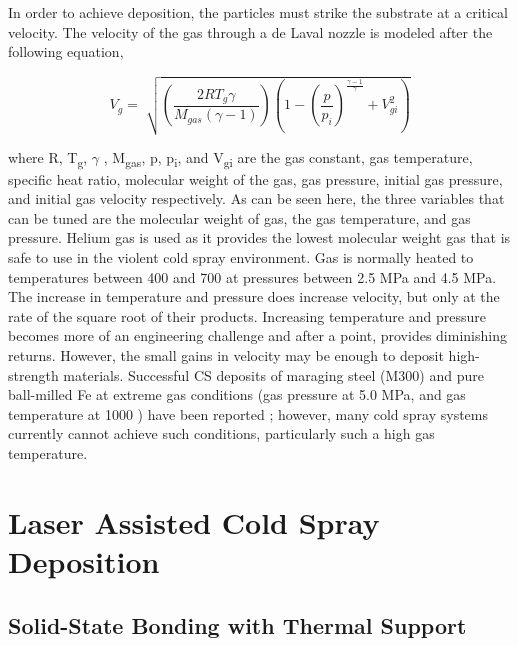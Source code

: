 		
		
		In order to achieve deposition, the particles must strike the substrate at a critical velocity. The velocity of the gas through a de Laval nozzle is modeled after the following equation,
		
		
		\begin{equation}
			V_{g}=\sqrt[]{ \left( \frac{2RT_{g} \gamma }{M_{gas} \left(  \gamma -1 \right) } \right)  \left( 1- \left( \frac{p}{p_{i}} \right) ^{\frac{ \gamma -1}{ \gamma }}+V_{gi}^{2} \right) }
		\end{equation}
		
		
		
		where R, T\textsubscript{g},  \(  \gamma  \) , M\textsubscript{gas}, p, p\textsubscript{i}, and V\textsubscript{gi}\textit{ }are\textit{\textsubscript{ }}the gas constant, gas temperature, specific heat ratio, molecular weight of the gas, gas pressure, initial gas pressure, and initial gas velocity respectively. As can be seen here, the three variables that can be tuned are the molecular weight of gas, the gas temperature, and gas pressure. Helium gas is used as it provides the lowest molecular weight gas that is safe to use in the violent cold spray environment. Gas is normally heated to temperatures between 400 \celsius{} and 700 \celsius{} at pressures between 2.5 MPa and 4.5 MPa. The increase in temperature and pressure does increase velocity, but only at the rate of the square root of their products. Increasing temperature and pressure becomes more of an engineering challenge and after a point, provides diminishing returns. However, the small gains in velocity may be enough to deposit high-strength materials. Successful CS deposits of maraging steel (M300) and pure ball-milled Fe at extreme gas conditions (gas pressure at 5.0 MPa, and gas temperature at 1000 \celsius{}) have been reported \cite{RN3405, RN3404}; however, many cold spray systems currently cannot achieve such conditions, particularly such a high gas temperature.

\section*{Laser Assisted Cold Spray Deposition}



	\subsection*{Solid-State Bonding with Thermal Support}

